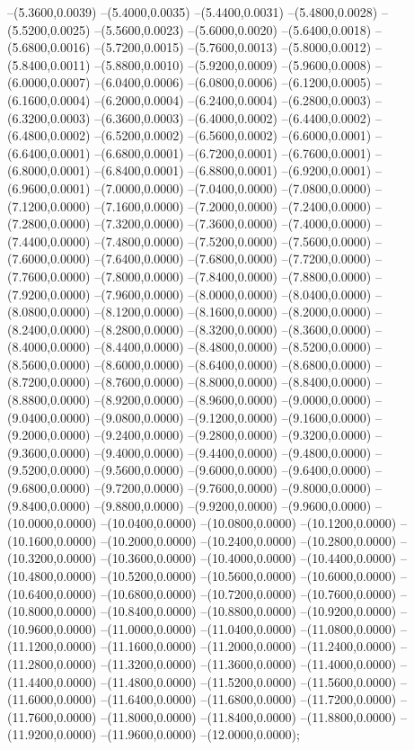 {	--(5.3600,0.0039)
	--(5.4000,0.0035)
	--(5.4400,0.0031)
	--(5.4800,0.0028)
	--(5.5200,0.0025)
	--(5.5600,0.0023)
	--(5.6000,0.0020)
	--(5.6400,0.0018)
	--(5.6800,0.0016)
	--(5.7200,0.0015)
	--(5.7600,0.0013)
	--(5.8000,0.0012)
	--(5.8400,0.0011)
	--(5.8800,0.0010)
	--(5.9200,0.0009)
	--(5.9600,0.0008)
	--(6.0000,0.0007)
	--(6.0400,0.0006)
	--(6.0800,0.0006)
	--(6.1200,0.0005)
	--(6.1600,0.0004)
	--(6.2000,0.0004)
	--(6.2400,0.0004)
	--(6.2800,0.0003)
	--(6.3200,0.0003)
	--(6.3600,0.0003)
	--(6.4000,0.0002)
	--(6.4400,0.0002)
	--(6.4800,0.0002)
	--(6.5200,0.0002)
	--(6.5600,0.0002)
	--(6.6000,0.0001)
	--(6.6400,0.0001)
	--(6.6800,0.0001)
	--(6.7200,0.0001)
	--(6.7600,0.0001)
	--(6.8000,0.0001)
	--(6.8400,0.0001)
	--(6.8800,0.0001)
	--(6.9200,0.0001)
	--(6.9600,0.0001)
	--(7.0000,0.0000)
	--(7.0400,0.0000)
	--(7.0800,0.0000)
	--(7.1200,0.0000)
	--(7.1600,0.0000)
	--(7.2000,0.0000)
	--(7.2400,0.0000)
	--(7.2800,0.0000)
	--(7.3200,0.0000)
	--(7.3600,0.0000)
	--(7.4000,0.0000)
	--(7.4400,0.0000)
	--(7.4800,0.0000)
	--(7.5200,0.0000)
	--(7.5600,0.0000)
	--(7.6000,0.0000)
	--(7.6400,0.0000)
	--(7.6800,0.0000)
	--(7.7200,0.0000)
	--(7.7600,0.0000)
	--(7.8000,0.0000)
	--(7.8400,0.0000)
	--(7.8800,0.0000)
	--(7.9200,0.0000)
	--(7.9600,0.0000)
	--(8.0000,0.0000)
	--(8.0400,0.0000)
	--(8.0800,0.0000)
	--(8.1200,0.0000)
	--(8.1600,0.0000)
	--(8.2000,0.0000)
	--(8.2400,0.0000)
	--(8.2800,0.0000)
	--(8.3200,0.0000)
	--(8.3600,0.0000)
	--(8.4000,0.0000)
	--(8.4400,0.0000)
	--(8.4800,0.0000)
	--(8.5200,0.0000)
	--(8.5600,0.0000)
	--(8.6000,0.0000)
	--(8.6400,0.0000)
	--(8.6800,0.0000)
	--(8.7200,0.0000)
	--(8.7600,0.0000)
	--(8.8000,0.0000)
	--(8.8400,0.0000)
	--(8.8800,0.0000)
	--(8.9200,0.0000)
	--(8.9600,0.0000)
	--(9.0000,0.0000)
	--(9.0400,0.0000)
	--(9.0800,0.0000)
	--(9.1200,0.0000)
	--(9.1600,0.0000)
	--(9.2000,0.0000)
	--(9.2400,0.0000)
	--(9.2800,0.0000)
	--(9.3200,0.0000)
	--(9.3600,0.0000)
	--(9.4000,0.0000)
	--(9.4400,0.0000)
	--(9.4800,0.0000)
	--(9.5200,0.0000)
	--(9.5600,0.0000)
	--(9.6000,0.0000)
	--(9.6400,0.0000)
	--(9.6800,0.0000)
	--(9.7200,0.0000)
	--(9.7600,0.0000)
	--(9.8000,0.0000)
	--(9.8400,0.0000)
	--(9.8800,0.0000)
	--(9.9200,0.0000)
	--(9.9600,0.0000)
	--(10.0000,0.0000)
	--(10.0400,0.0000)
	--(10.0800,0.0000)
	--(10.1200,0.0000)
	--(10.1600,0.0000)
	--(10.2000,0.0000)
	--(10.2400,0.0000)
	--(10.2800,0.0000)
	--(10.3200,0.0000)
	--(10.3600,0.0000)
	--(10.4000,0.0000)
	--(10.4400,0.0000)
	--(10.4800,0.0000)
	--(10.5200,0.0000)
	--(10.5600,0.0000)
	--(10.6000,0.0000)
	--(10.6400,0.0000)
	--(10.6800,0.0000)
	--(10.7200,0.0000)
	--(10.7600,0.0000)
	--(10.8000,0.0000)
	--(10.8400,0.0000)
	--(10.8800,0.0000)
	--(10.9200,0.0000)
	--(10.9600,0.0000)
	--(11.0000,0.0000)
	--(11.0400,0.0000)
	--(11.0800,0.0000)
	--(11.1200,0.0000)
	--(11.1600,0.0000)
	--(11.2000,0.0000)
	--(11.2400,0.0000)
	--(11.2800,0.0000)
	--(11.3200,0.0000)
	--(11.3600,0.0000)
	--(11.4000,0.0000)
	--(11.4400,0.0000)
	--(11.4800,0.0000)
	--(11.5200,0.0000)
	--(11.5600,0.0000)
	--(11.6000,0.0000)
	--(11.6400,0.0000)
	--(11.6800,0.0000)
	--(11.7200,0.0000)
	--(11.7600,0.0000)
	--(11.8000,0.0000)
	--(11.8400,0.0000)
	--(11.8800,0.0000)
	--(11.9200,0.0000)
	--(11.9600,0.0000)
	--(12.0000,0.0000);
}
